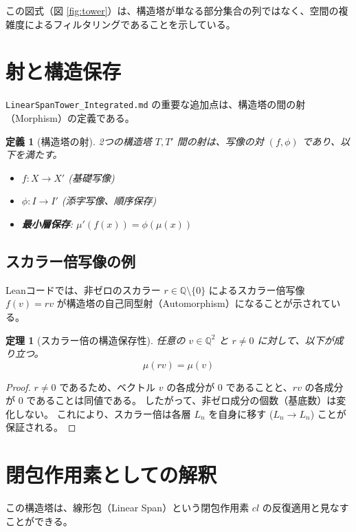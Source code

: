 \documentclass[11pt, a4paper]{article}
\newtheorem{definition}{定義}[section]
\newtheorem{theorem}{定理}[section]
\begin{document}
この図式（図 \ref{fig:tower}）は、構造塔が単なる部分集合の列ではなく、空間の複雑度によるフィルタリングであることを示している。

\section{射と構造保存}

\texttt{LinearSpanTower\_Integrated.md} の重要な追加点は、構造塔の間の射（Morphism）の定義である。

\begin{definition}[構造塔の射]
2つの構造塔 $T, T'$ 間の射は、写像の対 $(f, \phi)$ であり、以下を満たす。
\begin{itemize}
    \item $f: X \to X'$ (基礎写像)
    \item $\phi: I \to I'$ (添字写像、順序保存)
    \item \textbf{最小層保存}: $\mu'(f(x)) = \phi(\mu(x))$
\end{itemize}
\end{definition}

\subsection{スカラー倍写像の例}

Leanコードでは、非ゼロのスカラー $r \in \mathbb{Q} \setminus \{0\}$ によるスカラー倍写像 $f(v) = rv$ が構造塔の自己同型射（Automorphism）になることが示されている。

\begin{theorem}[スカラー倍の構造保存性]
任意の $v \in \mathbb{Q}^2$ と $r \neq 0$ に対して、以下が成り立つ。
\[ \mu(rv) = \mu(v) \]
\end{theorem}

\begin{proof}
$r \neq 0$ であるため、ベクトル $v$ の各成分が $0$ であることと、$rv$ の各成分が $0$ であることは同値である。
したがって、非ゼロ成分の個数（基底数）は変化しない。
これにより、スカラー倍は各層 $L_n$ を自身に移す ($L_n \to L_n$) ことが保証される。
\end{proof}

\section{閉包作用素としての解釈}

この構造塔は、線形包（Linear Span）という閉包作用素 $cl$ の反復適用と見なすことができる。
\end{document}
